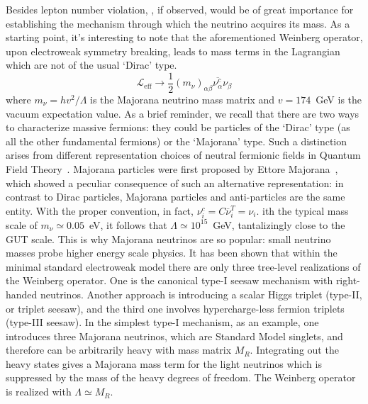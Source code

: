 Besides lepton number violation, \onbb, if observed, would be of great
importance for establishing the mechanism through which the neutrino acquires
its mass. As a starting point, it's interesting to note that the aforementioned
Weinberg operator, upon electroweak symmetry breaking, leads to mass terms in
the Lagrangian which are not of the usual `Dirac' type.
\begin{equation}\label{eq:nbb:wein-sb}
  \mathcal{L}_\text{eff} \longrightarrow \frac{1}{2} (m_\nu)_{\alpha\beta}
                                         \overline{\nu_\alpha^c} \nu_\beta
\end{equation}
where $m_\nu = h v^2 / \Lambda$ is the Majorana neutrino mass matrix and $v =
174$~GeV is the vacuum expectation value.  As a brief reminder, we recall that
there are two ways to characterize massive fermions: they could be particles of
the `Dirac' type (as all the other fundamental fermions) or the `Majorana'
type.  Such a distinction arises from different representation choices of
neutral fermionic fields in Quantum Field Theory~\cite{Giunti2007}.  Majorana
particles were first proposed by Ettore Majorana~\cite{Majorana1932}, which
showed a peculiar consequence of such an alternative representation: in
contrast to Dirac particles, Majorana particles and anti-particles are the same
entity. With the proper convention, in fact, $\nu_i^c = C\overline{\nu}^T_i = \nu_i$.
ith the typical mass scale of $m_\nu \simeq 0.05$~eV, it follows that
$\Lambda \simeq 10^{15}$~GeV, tantalizingly close to the GUT scale. This is why
Majorana neutrinos are so popular: small neutrino masses probe higher energy
scale physics. It has been shown that within the minimal standard electroweak
model there are only three tree-level realizations of the Weinberg operator.
One is the canonical type-I seesaw mechanism with right-handed neutrinos.
Another approach is introducing a scalar Higgs triplet (type-II, or triplet
seesaw), and the third one involves hypercharge-less fermion triplets (type-III
seesaw).  In the simplest type-I mechanism, as an example, one introduces three
Majorana neutrinos, which are Standard Model singlets, and therefore can be
arbitrarily heavy with mass matrix $M_R$. Integrating out the heavy states
gives a Majorana mass term for the light neutrinos which is suppressed by the
mass of the heavy degrees of freedom. The Weinberg operator is realized with
$\Lambda \simeq M_R$.

